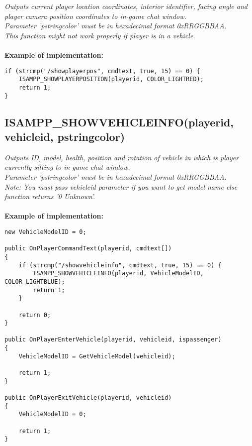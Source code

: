 \documentclass{article}
\begin{document}
\textit{Outputs current player location coordinates, interior identifier, facing angle and player camera position coordinates to in-game chat window.
\\Parameter 'pstringcolor' must be in hexadecimal format 0xRRGGBBAA.
\\This function might not work properly if player is in a vehicle.}
\\
\\
\textbf{Example of implementation:}
\begin{verbatim}
if (strcmp("/showplayerpos", cmdtext, true, 15) == 0) {
    ISAMPP_SHOWPLAYERPOSITION(playerid, COLOR_LIGHTRED);
    return 1;
}
\end{verbatim}


\subsection{ISAMPP\_SHOWVEHICLEINFO(playerid, vehicleid, pstringcolor)}

\textit{Outputs ID, model, health, position and rotation of vehicle in which is player currently sitting to in-game chat window.
\\Parameter 'pstringcolor' must be in hexadecimal format 0xRRGGBBAA.
\\Note: You must pass vehicleid parameter if you want to get model name else function returns '0 Unknown'.}
\\
\\
\textbf{Example of implementation:}
\begin{verbatim}
new VehicleModelID = 0;

public OnPlayerCommandText(playerid, cmdtext[])
{
    if (strcmp("/showvehicleinfo", cmdtext, true, 15) == 0) {
        ISAMPP_SHOWVEHICLEINFO(playerid, VehicleModelID, COLOR_LIGHTBLUE);
        return 1;
    }

    return 0;
}

public OnPlayerEnterVehicle(playerid, vehicleid, ispassenger)
{
    VehicleModelID = GetVehicleModel(vehicleid);

    return 1;
}

public OnPlayerExitVehicle(playerid, vehicleid)
{
    VehicleModelID = 0;

    return 1;
}
\end{verbatim}
\end{document}
